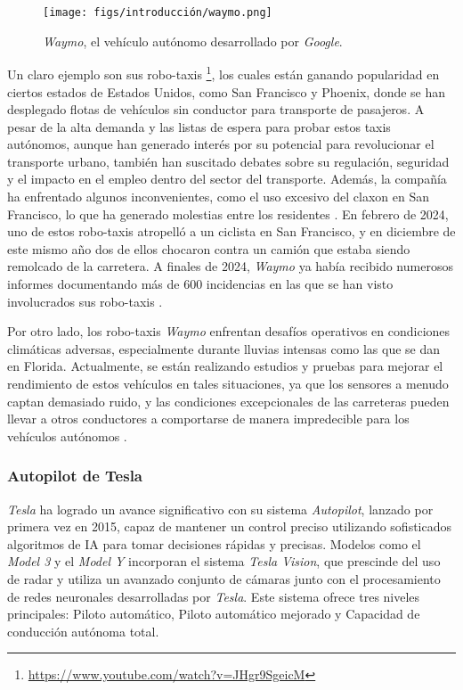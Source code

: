 \begin{figure}[ht]
\begin{center}
\texttt{[image: figs/introducción/waymo.png]}
\end{center}
\caption{\textit{Waymo}, el vehículo autónomo desarrollado por \textit{Google}.}
\label{waymo}
\end{figure}

Un claro ejemplo son sus robo-taxis \footnote{\url{https://www.youtube.com/watch?v=JHgr9SgeicM}}, los cuales están ganando popularidad en ciertos estados de Estados Unidos, como San Francisco y Phoenix, donde se han desplegado flotas de vehículos sin conductor para transporte de pasajeros. A pesar de la alta demanda y las listas de espera para probar estos taxis autónomos, aunque han generado interés por su potencial para revolucionar el transporte urbano, también han suscitado debates sobre su regulación, seguridad y el impacto en el empleo dentro del sector del transporte. Además, la compañía ha enfrentado algunos inconvenientes, como el uso excesivo del claxon en San Francisco, lo que ha generado molestias entre los residentes \cite{robotaxis-waymo}. En febrero de 2024, uno de estos robo-taxis atropelló a un ciclista en San Francisco, y en diciembre de este mismo año dos de ellos chocaron contra un camión que estaba siendo remolcado de la carretera. A finales de 2024, \textit{Waymo} ya había recibido numerosos informes documentando más de 600 incidencias en las que se han visto involucrados sus robo-taxis \cite{waymo-wiki}. 

Por otro lado, los robo-taxis \textit{Waymo} enfrentan desafíos operativos en condiciones climáticas adversas, especialmente durante lluvias intensas como las que se dan en Florida. Actualmente, se están realizando estudios y pruebas para mejorar el rendimiento de estos vehículos en tales situaciones, ya que los sensores a menudo captan demasiado ruido, y las condiciones excepcionales de las carreteras pueden llevar a otros conductores a comportarse de manera impredecible para los vehículos autónomos \cite{waymo-florida}.

\subsubsection{Autopilot de Tesla}

\textit{Tesla} ha logrado un avance significativo con su sistema \textit{Autopilot}, lanzado por primera vez en 2015, capaz de mantener un control preciso utilizando sofisticados algoritmos de \ac{IA} para tomar decisiones rápidas y precisas. Modelos como el \textit{Model 3} y el \textit{Model Y} incorporan el sistema \textit{Tesla Vision}, que prescinde del uso de radar y utiliza un avanzado conjunto de cámaras junto con el procesamiento de redes neuronales desarrolladas por \textit{Tesla}. Este sistema ofrece tres niveles principales: Piloto automático, Piloto automático mejorado y Capacidad de conducción autónoma total.


